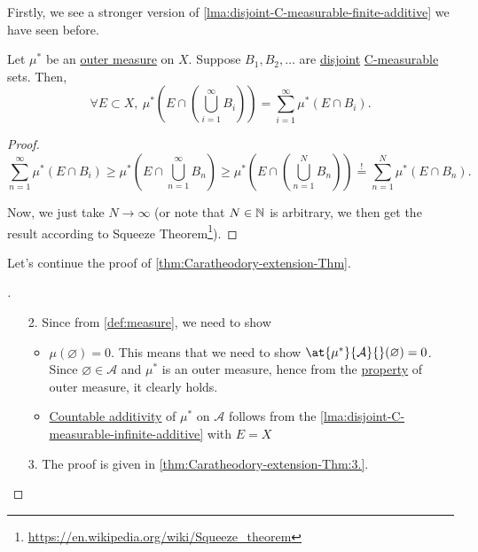Firstly, we see a stronger version of \autoref{lma:disjoint-C-measurable-finite-additive} we have seen before.
\begin{lemma}\label{lma:disjoint-C-measurable-infinite-additive}
	Let \(\mu^{*} \) be an \hyperref[def:outer-measure]{outer measure} on \(X\). Suppose \(B_1, B_2, \ldots\) are \underline{disjoint} \hyperref[def:C-measurable]{C-measurable} sets.
	Then,
	\[
		\forall E\subset X,\ \mu^{*} \left(E\cap \left(\bigcup\limits_{i=1}^{\infty} B_{i}\right)\right) = \sum\limits_{i=1}^{\infty} \mu^{*} \left(E\cap B_i\right).
	\]
\end{lemma}
\begin{proof}
	\[
		\sum\limits_{n=1}^{\infty} \mu^{*} (E\cap B_{i}) \geq \mu^{*} \left(E\cap \bigcup\limits_{n=1}^{\infty} B_{n}\right) \geq\mu^{*} \left(E\cap \left(\bigcup\limits_{n=1}^{N} B_{n}\right)\right) \overset{\hyperref[lma:disjoint-C-measurable-finite-additive]{!}}{=} \sum\limits_{n=1}^{N} \mu^{*} \left(E\cap B_n\right).
	\]

	Now, we just take \(N\to \infty \) (or note that \(N\in\mathbb{\MakeUppercase{N}} \) is arbitrary, we then get the result according to
	Squeeze Theorem\footnote{\url{https://en.wikipedia.org/wiki/Squeeze_theorem}}).
\end{proof}
Let's continue the proof of \autoref{thm:Caratheodory-extension-Thm}.
\begin{proof}[\unskip\nopunct]\label{pf:Caratheodory-extension-Thm-cont}
	\begin{enumerate}
		\item[2.] Since from \autoref{def:measure}, we need to show
			\begin{itemize}
				\item \(\mu (\varnothing ) = 0\). This means that we need to show \(\at{\mu^{*} }{\mathcal{A}}{}(\varnothing ) = 0\). Since \(\varnothing \in \mathcal{A} \) and \(\mu^{*}\) is
				      an outer measure, hence from the \hyperref[def:outer-measure-empty-measure]{property} of outer measure, it clearly holds.
				\item \hyperref[def:measure-countable-additivity]{Countable additivity} of \(\mu^{*} \) on \(\mathcal{A}\) follows from the \autoref{lma:disjoint-C-measurable-infinite-additive} with \(E = X\)
			\end{itemize}
		\item[3.] The proof is given in \autoref{thm:Caratheodory-extension-Thm:3.}.
	\end{enumerate}
\end{proof}


